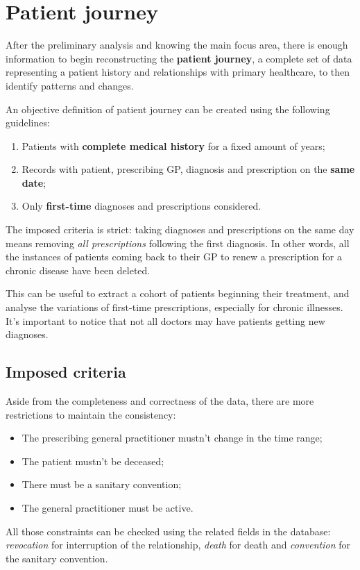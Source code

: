 \chapter{Patient journey}
After the preliminary analysis and knowing the main focus area, there is enough information to begin reconstructing the \textbf{patient journey}, a complete set of data representing a patient history and relationships with primary healthcare, to then identify patterns and changes. 

An objective definition of patient journey can be created using the following guidelines:
\begin{enumerate}
	\item Patients with \textbf{complete medical history} for a fixed amount of years;
	\item Records with patient, prescribing GP, diagnosis and prescription on the \textbf{same date};
	\item Only \textbf{first-time} diagnoses and prescriptions considered.
\end{enumerate}

The imposed criteria is strict: taking diagnoses and prescriptions on the same day means removing \textit{all prescriptions} following the first diagnosis. In other words, all the instances of patients coming back to their GP to renew a prescription for a chronic disease have been deleted.

This can be useful to extract a cohort of patients beginning their treatment, and analyse the variations of first-time prescriptions, especially for chronic illnesses. It's important to notice that not all doctors may have patients getting new diagnoses.

\section{Imposed criteria}
Aside from the completeness and correctness of the data, there are more restrictions to maintain the consistency:
\begin{itemize}
	\item The prescribing general practitioner mustn't change in the time range;
	\item The patient mustn't be deceased;
	\item There must be a sanitary convention;
	\item The general practitioner must be active.
\end{itemize}

All those constraints can be checked using the related fields in the database: \textit{revocation} for interruption of the relationship, \textit{death} for death and \textit{convention} for the sanitary convention.

